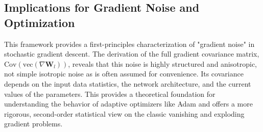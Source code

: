 \subsection{Implications for Gradient Noise and Optimization}
This framework provides a first-principles characterization of "gradient noise" in stochastic gradient descent. The derivation of the full gradient covariance matrix, $\text{Cov}(\text{vec}(\nabla\mathbf{W}_l))$, reveals that this noise is highly structured and anisotropic, not simple isotropic noise as is often assumed for convenience. Its covariance depends on the input data statistics, the network architecture, and the current values of the parameters. This provides a theoretical foundation for understanding the behavior of adaptive optimizers like Adam \cite{KingmaBa2014Adam} and offers a more rigorous, second-order statistical view on the classic vanishing and exploding gradient problems.

\ifdefined\ispartofbook
\else
  
  
\fi
